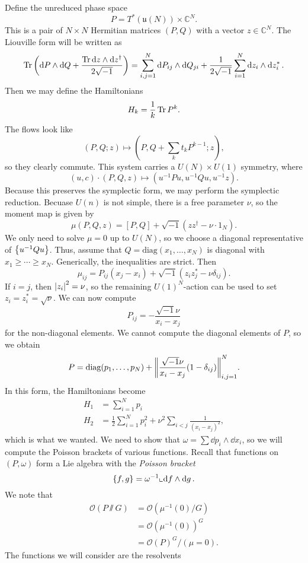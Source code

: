\documentclass[leqno, openany]{memoir}
\theoremstyle{definition}
\theoremstyle{remark}
\theoremstyle{plain}
\theoremstyle{definition}
\theoremstyle{remark}
\newcommand{\C}{\mathbb{C}}
\newcommand{\mc}[1]{\mathcal{#1}}
\newcommand{\mf}[1]{\mathfrak{#1}}
\newcommand{\mr}[1]{\mathrm{#1}}
\begin{document}
Define the unreduced phase space
\[ P = T^* (\mf{u}(N)) \times \C^N. \]
This is a pair of $N \times N$ Hermitian matrices $(P,Q)$ with a vector $z \in \C^N$. The Liouville form will be written as
\[ \Tr \qty( \dd{P} \wedge \dd{Q} + \frac{\Tr \dd{z} \wedge \dd{z^{\dag}}}{2\sqrt{-1}}) = \sum_{i,j=1}^N \dd{P_{ij}} \wedge \dd{Q_{ji}} + \frac{1}{2\sqrt{-1}} \sum_{i=1}^N \dd{z_i} \wedge \dd{z_i^*}. \]
Then we may define the Hamiltonians
\[ H_k = \frac{1}{k} \Tr P^k. \]
The flows look like
\[ (P,Q; z) \mapsto (P, Q + \sum_k t_k P^{k-1}; z), \]
so they clearly commute. This system carries a $U(N) \times U(1)$ symmetry, where
\[ (u,c) \cdot (P,Q,z) \mapsto (u^{-1}P u, u^{-1} Q u, u^{-1} z). \]
Because this preserves the symplectic form, we may perform the symplectic reduction. Becuase $U(n)$ is not simple, there is a free parameter $\nu$, so the moment map is given by
\[ \mu(P,Q,z) = [P,Q] + \sqrt{-1} (zz^{\dag} - \nu \cdot 1_N). \]
We only need to solve $\mu = 0$ up to $U(N)$, so we choose a diagonal representative of $\qty{u^{-1}Qu}$. Thus, assume that $Q = \mr{diag}(x_1, \ldots, x_N)$ is diagonal with $x_1 \geq \cdots \geq x_N$. Generically, the inequalities are strict. Then
\[ \mu_{ij} = P_{ij}(x_j - x_i) + \sqrt{-1} (z_i z_j^* - \nu \delta_{ij}). \]
If $i=j$, then $\abs{z_i}^2 = \nu$, so the remaining $U(1)^N$-action can be used to set $z_i = z_i^* = \sqrt{\nu}$. We can now compute
\[ P_{ij} = - \frac{\sqrt{-1} \nu}{x_i-x_j} \]
for the non-diagonal elements. We cannot compute the diagonal elements of $P$, so we obtain
\[ P = \mr{diag}(p_1, \ldots, p_N) + \norm{\frac{\sqrt{-1} \nu}{x_i-x_j}(1-\delta_{ij})}_{i,j=1}^N. \]
In this form, the Hamiltonians become
\begin{align*}
  H_1 &= \sum_{i=1}^N p_i \\
  H_2 &= \frac{1}{2} \sum_{i=1}^N p_i^2 + \nu^2 \sum_{i<j} \frac{1}{(x_i-x_j)^2},
\end{align*}
which is what we wanted. We need to show that $\omega = \sum \dd{p_i} \wedge \dd{x_i}$, so we will compute the Poisson brackets of various functions. Recall that functions on $(P, \omega)$ form a Lie algebra with the \textit{Poisson bracket}
\[ \qty{f,g} = \omega^{-1} \llcorner \dd{f} \wedge \dd{g}. \]
We note that
\begin{align*}
  \mc{O}(P \sslash G) &= \mc{O}(\mu^{-1}(0)/G) \\
                      &= \mc{O}(\mu^{-1}(0))^G \\
                      &= \mc{O}(P)^G/(\mu = 0).
\end{align*}
The functions we will consider are the resolvents
\end{document}
